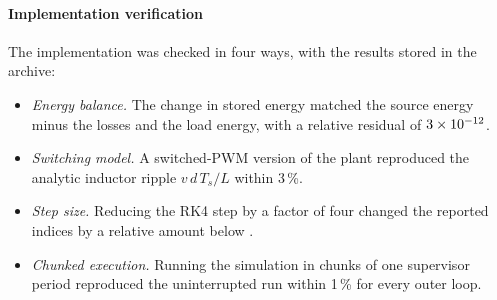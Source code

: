 \paragraph{Implementation verification} The implementation was checked in four ways, with the results stored in the archive:
\begin{itemize}
\item \emph{Energy balance.} The change in stored energy matched the source energy minus the losses and the load energy, with a relative residual of $3\times10^{-12}$.
\item \emph{Switching model.} A switched-PWM version of the plant reproduced the analytic inductor ripple $v\,d\,T_s/L$ within 3\,\%.
\item \emph{Step size.} Reducing the RK4 step by a factor of four changed the reported indices by a relative amount below \TimestepRelPct.
\item \emph{Chunked execution.} Running the simulation in chunks of one supervisor period reproduced the uninterrupted run within 1\,\% for every outer loop.
\end{itemize}
